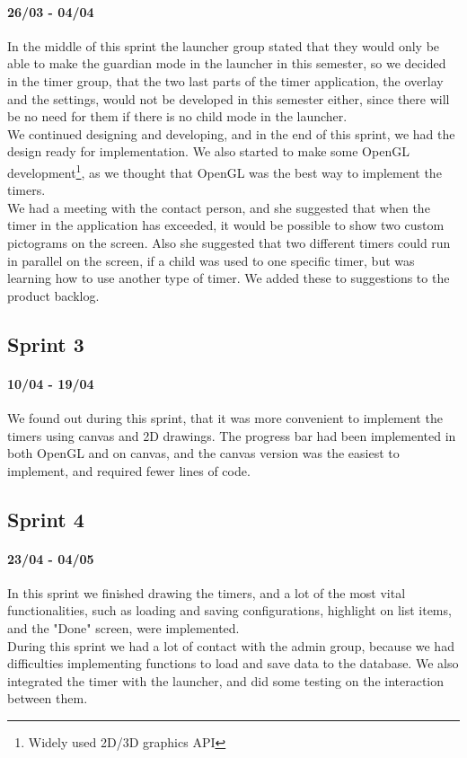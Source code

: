 \paragraph{26/03 - 04/04}
In the middle of this sprint the launcher group stated that they would only be able to make the guardian mode in the launcher in this semester, so we decided in the timer group, that the two last parts of the timer application, the overlay and the settings, would not be developed in this semester either, since there will be no need for them if there is no child mode in the launcher.\\
	We continued designing and developing, and in the end of this sprint, we had the design ready for implementation. We also started to make some OpenGL development\footnote{Widely used 2D/3D graphics API}, as we thought that OpenGL was the best way to implement the timers.\\
	We had a meeting with the contact person, and she suggested that when the timer in the application has exceeded, it would be possible to show two custom pictograms on the screen. Also she suggested that two different timers could run in parallel on the screen, if a child was used to one specific timer, but was learning how to use another type of timer. We added these to suggestions to the product backlog.

\subsection*{Sprint 3}
\paragraph{10/04 - 19/04}
We found out during this sprint, that it was more convenient to implement the timers using canvas and 2D drawings. The progress bar had been implemented in both OpenGL and on canvas, and the canvas version was the easiest to implement, and required fewer lines of code.	

\subsection*{Sprint 4}
\paragraph{23/04 - 04/05}
In this sprint we finished drawing the timers, and a lot of the most vital functionalities, such as loading and saving configurations, highlight on list items, and the "Done" screen, were implemented.\\
	During this sprint we had a lot of contact with the admin group, because we had difficulties implementing functions to load and save data to the database. We also integrated the timer with the launcher, and did some testing on the interaction between them.

